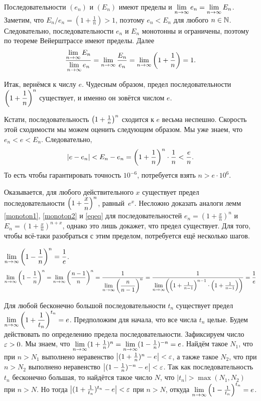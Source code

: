\documentclass[a4paper,12pt]{article}
\begin{document}
\label{eqeq}
Последовательности $(e_n)$ и $(E_n)$ имеют пределы и $\lim\limits_{n \rightarrow \infty} e_n = \lim\limits_{n \rightarrow \infty} E_n$.
Заметим, что $E_n/e_n = (1+\frac{1}{n})>1$, поэтому $e_n<E_n$ для любого $n\in\mathbb{N}$.
Следовательно, последовательности $e_n$ и $E_n$ монотонны и ограничены,
поэтому по теореме Вейерштрассе имеют пределы.
Далее
$$
\dfrac{\limn E_n}{\limn e_n} = \limn\frac{E_n}{e_n} = \limn \hr{1+\frac{1}n} = 1.
\vspace{-4mm}
$$


\bigskip

Итак, вернёмся к числу $e$.
Чудесным образом, предел последовательности $\left(1+\dfrac1n\right)^n$ существует,
и именно он зовётся числом $e$.


Кстати, последовательность $\left(1+\frac1n\right)^n$ сходится к $e$ весьма неспешно.
Скорость этой сходимости мы можем оценить следующим образом.
Мы уже знаем, что $e_n < e < E_n$.
Следовательно,
$$
|e - e_n| < E_n - e_n = \left(1+\frac1n\right)^n\cdot\frac{1}{n} < \frac{e}{n}.
$$
То есть чтобы гарантировать точность $10^{-6}$, потребуется взять $n>e\cdot 10^6$.



Оказывается, для любого действительного $x$ существует предел последовательности
$\left(1+\dfrac{x}{n}\right)^n$, равный~$e^x$.
Несложно доказать аналоги лемм \ref{monoton1}, \ref{monoton2} и \ref{eqeq} для последовательностей
$e_n = (1+\frac{x}{n})^n$ и $E_n = (1+\frac{x}{n})^{n+x}$,
однако это лишь докажет, что предел существует.
Для того, чтобы всё-таки разобраться с этим пределом, потребуется ещё несколько шагов.

$\lim\limits_{n \rightarrow \infty}\left(1-\dfrac1n\right)^n = \dfrac{1}{e}$.
$$
\limn\hr{1-\dfrac1n}^n
=
\limn\hr{\dfrac{n-1}{n}}^n
=
\dfrac{1}{\limn\hr{\dfrac{n}{n-1}}^n }
=
\dfrac{1}{\limn\bbr{\hr{1 + \frac{1}{n-1}}^{n-1} \cdot \hr{1 + \frac{1}{n-1}}}}
=
\dfrac{1}{e}
\vspace{-4mm}
$$


\label{lem_besk}
Для любой бесконечно большой последовательности $t_n$ существует предел
$\lim\limits_{n \rightarrow \infty}\left(1+\dfrac{1}{t_n}\right)^{t_n}=e$.
Предположим для начала, что все числа $t_n$ целые.
Будем действовать по определению предела последовательности.
Зафиксируем число $\varepsilon>0$.
Мы знаем, что 
$\lim\limits_{n \rightarrow \infty}(1+\frac1n)^n = \lim\limits_{n \rightarrow \infty}(1-\frac1n)^{-n} = e$.
Найдём такое $N_1$, что при $n > N_1$ выполнено неравенство $\bigl|(1+\frac1n)^n - e\bigr|<\varepsilon$,
а также такое $N_2$, что при $n > N_2$ выполнено неравенство $\bigl|(1-\frac1n)^{-n} - e\bigr|<\varepsilon$.
Так как последовательность $t_n$ бесконечно большая, то найдётся такое число $N$,
что $|t_n| > \max(N_1, N_2)$ при $n>N$.
Но тогда $\bigl|(1+\frac1{t_n})^{t_n} - e\bigr|<\varepsilon$ при $n>N$, откуда
$\lim\limits_{n \rightarrow \infty}\left(1-\frac{1}{t_n}\right)^{t_n}=e$.
\end{document}
